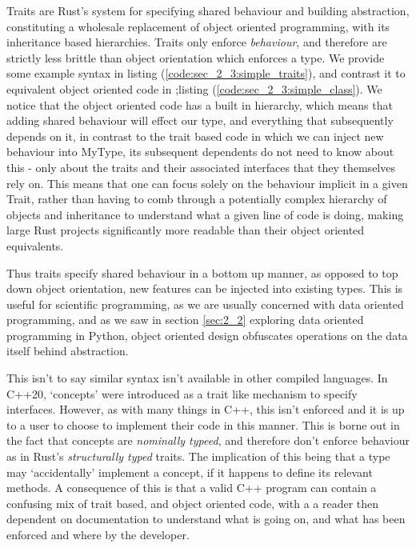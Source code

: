 Traits are Rust's system for specifying shared behaviour and building abstraction, constituting a wholesale replacement of object oriented programming, with its inheritance based hierarchies. Traits only enforce \textit{behaviour}, and therefore are strictly less brittle than object orientation which enforces a type. We provide some example syntax in listing (\ref{code:sec_2_3:simple_traits}), and contrast it to equivalent object oriented code in ;listing (\ref{code:sec_2_3:simple_class}). We notice that the object oriented code has a built in hierarchy, which means that adding shared behaviour will effect our  type, and everything that subsequently depends on it, in contrast to the trait based code in which we can inject new behaviour into MyType, its subsequent dependents do not need to know about this - only about the traits and their associated interfaces that they themselves rely on. This means that one can focus solely on the behaviour implicit in a given Trait, rather than having to comb through a potentially complex hierarchy of objects and inheritance to understand what a given line of code is doing, making large Rust projects significantly more readable than their object oriented equivalents.

Thus traits specify shared behaviour in a bottom up manner, as opposed to top down object orientation, new features can be injected into existing types. This is useful for scientific programming, as we are usually concerned with data oriented programming, and as we saw in section \ref{sec:2_2} exploring data oriented programming in Python, object oriented design obfuscates operations on the data itself behind abstraction.



This isn't to say similar syntax isn't available in other compiled languages. In C++20, `concepts' were introduced as a trait like mechanism to specify interfaces. However, as with many things in C++, this isn't enforced and it is up to a user to choose to implement their code in this manner. This is borne out in the fact that concepts are \textit{nominally typeed}, and therefore don't enforce behaviour as in Rust's \textit{structurally typed} traits. The implication of this being that a type may `accidentally' implement a concept, if it happens to define its relevant methods. A consequence of this is that a valid C++ program can contain a confusing mix of trait based, and object oriented code, with a a reader then dependent on documentation to understand what is going on, and what has been enforced and where by the developer.

